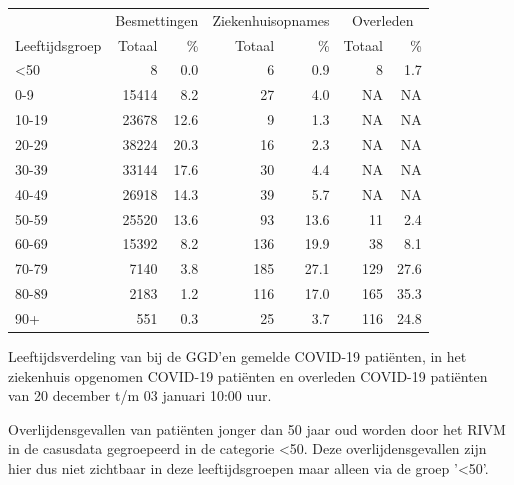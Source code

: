 \documentclass[
  english,
  man,floatsintext]{apa6}
\begin{document}
\begin{table}
\centering\begingroup\fontsize{11}{13}\selectfont

\begin{threeparttable}
\begin{tabular}{lrrrrrr}
\toprule
\multicolumn{1}{c}{ } & \multicolumn{2}{c}{Besmettingen} & \multicolumn{2}{c}{Ziekenhuisopnames} & \multicolumn{2}{c}{Overleden} \\
\cmidrule(l{3pt}r{3pt}){2-3} \cmidrule(l{3pt}r{3pt}){4-5} \cmidrule(l{3pt}r{3pt}){6-7}
Leeftijdsgroep & Totaal & \% & Totaal & \% & Totaal & \%\\
\midrule
<50 & 8 & 0.0 & 6 & 0.9 & 8 & 1.7\\
0-9 & 15414 & 8.2 & 27 & 4.0 & NA & NA\\
10-19 & 23678 & 12.6 & 9 & 1.3 & NA & NA\\
20-29 & 38224 & 20.3 & 16 & 2.3 & NA & NA\\
30-39 & 33144 & 17.6 & 30 & 4.4 & NA & NA\\
40-49 & 26918 & 14.3 & 39 & 5.7 & NA & NA\\
50-59 & 25520 & 13.6 & 93 & 13.6 & 11 & 2.4\\
60-69 & 15392 & 8.2 & 136 & 19.9 & 38 & 8.1\\
70-79 & 7140 & 3.8 & 185 & 27.1 & 129 & 27.6\\
80-89 & 2183 & 1.2 & 116 & 17.0 & 165 & 35.3\\
90+ & 551 & 0.3 & 25 & 3.7 & 116 & 24.8\\
\bottomrule
\end{tabular}
\begin{tablenotes}
\item[1] Leeftijdsverdeling van bij de GGD’en gemelde COVID-19 patiënten, in het ziekenhuis opgenomen COVID-19 patiënten en overleden COVID-19 patiënten van 20 december t/m 03 januari 10:00 uur.
\item[2] Overlijdensgevallen van patiënten jonger dan 50 jaar oud worden door het RIVM in de casusdata gegroepeerd in de categorie <50. Deze overlijdensgevallen zijn hier dus niet zichtbaar in deze leeftijdsgroepen maar alleen via de groep '<50'.
\end{tablenotes}
\end{threeparttable}
\endgroup{}
\end{table}

\newpage
\end{document}
